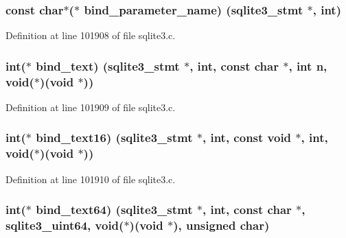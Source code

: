 \subsubsection[{bind\+\_\+parameter\+\_\+name}]{\setlength{\rightskip}{0pt plus 5cm}const char$\ast$($\ast$ bind\+\_\+parameter\+\_\+name) ({\bf sqlite3\+\_\+stmt} $\ast$, int)}\label{structsqlite3__api__routines_a1680ea8ab78f3c1a459a4c56a91ca496}


Definition at line 101908 of file sqlite3.\+c.

\hypertarget{structsqlite3__api__routines_aea3f9722b1cfa2911ada47656ca88ce8}{}
\subsubsection[{bind\+\_\+text}]{\setlength{\rightskip}{0pt plus 5cm}int($\ast$ bind\+\_\+text) ({\bf sqlite3\+\_\+stmt} $\ast$, int, const char $\ast$, int n, void($\ast$)(void $\ast$))}\label{structsqlite3__api__routines_aea3f9722b1cfa2911ada47656ca88ce8}


Definition at line 101909 of file sqlite3.\+c.

\hypertarget{structsqlite3__api__routines_a8dae957f5c7a3a2efd105d4bac1e85f6}{}
\subsubsection[{bind\+\_\+text16}]{\setlength{\rightskip}{0pt plus 5cm}int($\ast$ bind\+\_\+text16) ({\bf sqlite3\+\_\+stmt} $\ast$, int, const void $\ast$, int, void($\ast$)(void $\ast$))}\label{structsqlite3__api__routines_a8dae957f5c7a3a2efd105d4bac1e85f6}


Definition at line 101910 of file sqlite3.\+c.

\hypertarget{structsqlite3__api__routines_a1b88c42d9886d3a9110dfdf19e1ad539}{}
\subsubsection[{bind\+\_\+text64}]{\setlength{\rightskip}{0pt plus 5cm}int($\ast$ bind\+\_\+text64) ({\bf sqlite3\+\_\+stmt} $\ast$, int, const char $\ast$, {\bf sqlite3\+\_\+uint64}, void($\ast$)(void $\ast$), unsigned char)}\label{structsqlite3__api__routines_a1b88c42d9886d3a9110dfdf19e1ad539}


